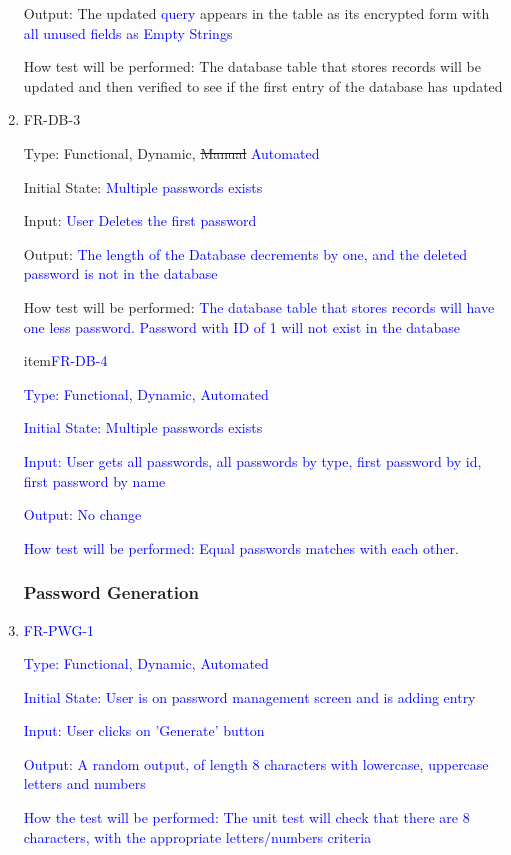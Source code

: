 \documentclass[12pt, titlepage]{article}
\begin{document}
\begin{enumerate}
Output: The updated \textcolor{blue}{query} appears in the table as its encrypted form with \textcolor{blue}{all unused fields as Empty Strings}

How test will be performed: The database table that stores records will be updated and then verified to see if the first entry of the database has updated

\item{FR-DB-3\\}

Type: Functional, Dynamic, \sout{Manual} \textcolor{blue}{Automated}

Initial State: \textcolor{blue}{Multiple passwords exists}

Input: \textcolor{blue}{User Deletes the first password}

Output: \textcolor{blue}{The length of the Database decrements by one, and the deleted password is not in the database}

How test will be performed: \textcolor{blue}{The database table that stores records will have one less password. Password with ID of 1 will not exist in the database}

item{\textcolor{blue}{FR-DB-4}\\}

\textcolor{blue}{Type: Functional, Dynamic, Automated}

\textcolor{blue}{Initial State: Multiple passwords exists}

\textcolor{blue}{Input: User gets all passwords, all passwords by type, first password by id, first password by name}

\textcolor{blue}{Output: No change}

\textcolor{blue}{How test will be performed: Equal passwords matches with each other.} 

\subsubsection{Password Generation}

\item{\textcolor{blue}{FR-PWG-1}\\}

\textcolor{blue}{Type: Functional, Dynamic, Automated}

\textcolor{blue}{Initial State: User is on password management screen and is adding entry}

\textcolor{blue}{Input: User clicks on 'Generate' button}

\textcolor{blue}{Output: A random output, of length 8 characters with lowercase, uppercase letters and numbers}

\textcolor{blue}{How the test will be performed: The unit test will check that there are 8 characters, with the appropriate letters/numbers criteria}

\end{enumerate}
\end{document}
